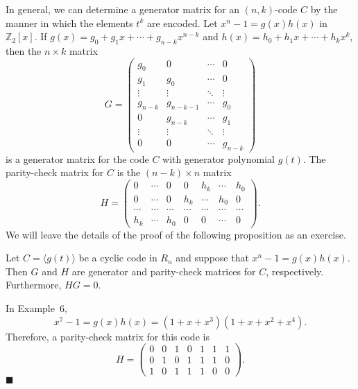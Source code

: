\medskip
 
In general, we can determine a generator matrix for an $(n, k)$-code $C$ by the manner in which the elements $t^k$ are encoded. Let $x^n - 1 = g(x) h(x)$ in ${\mathbb Z}_2[x]$. If $g(x) = g_0 + g_1 x + \cdots + g_{n-k} x^{n-k}$ and $h(x) = h_0 + h_1 x +  \cdots + h_k x^k$, then the $n \times k$ matrix
$$
G = 
\left(
\begin{array}{cccc}
g_0 & 0   & \cdots & 0 \\
g_1 & g_0 & \cdots & 0 \\
\vdots & \vdots &\ddots & \vdots \\
g_{n-k}   & g_{n-k-1} & \cdots & g_0 \\
0   & g_{n-k} & \cdots & g_{1} \\
\vdots & \vdots & \ddots & \vdots \\
0   & 0 & \cdots & g_{n-k}
\end{array}
\right)
$$
is a generator matrix for the code $C$ with generator polynomial $g(t)$.  The parity-check matrix for $C$ is the $(n-k) \times n$ matrix 
$$
H =
\left(
\begin{array}{cccccccc}
0   & \cdots & 0   & 0      & h_k    & \cdots & h_0 \\
0   & \cdots & 0 & h_k & \cdots & h_0    & 0 \\
\cdots  & \cdots & \cdots  & \cdots &  \cdots &  \cdots & \cdots \\
h_k & \cdots & h_0 & 0      & 0      & \cdots & 0 
\end{array}
\right).
$$
We will leave the details of the proof of the following proposition as an exercise.  

\begin{proposition}
Let $C = \langle g(t) \rangle$ be a cyclic code in $R_n$ and suppose that $x^n - 1 = g(x) h(x)$.  Then $G$ and $H$ are generator and parity-check matrices  for $C$, respectively.  Furthermore, $HG = 0$. 
\end{proposition}

\medskip

In Example~6,
$$
x^7 - 1 = g(x) h(x) = (1 + x + x^3)(1 + x + x^2 + x^4).
$$
Therefore, a parity-check matrix for this code is
$$
H =
\left(
\begin{array}{ccccccc}
0 & 0 & 1 & 0 & 1 & 1 & 1 \\
0 & 1 & 0 & 1 & 1 & 1 & 0 \\
1 & 0 & 1 & 1 & 1 & 0 & 0
\end{array}
\right).
$$
\hspace{\fill} $\blacksquare$

